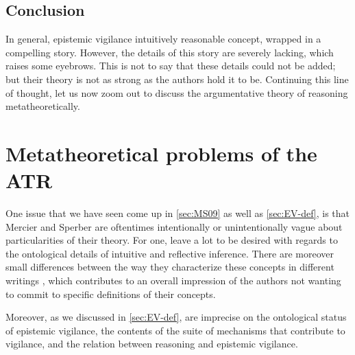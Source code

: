 \subsection{Conclusion}

In general, epistemic vigilance intuitively reasonable concept, wrapped in a compelling story. However, the details of this story are severely lacking, which raises some eyebrows. This is not to say that these details could not be added; but their theory is not as strong as the authors hold it to be. Continuing this line of thought, let us now zoom out to discuss the argumentative theory of reasoning metatheoretically.

\section{Metatheoretical problems of the ATR}
\label{sec:ont-atr}

One issue that we have seen come up in \cref{sec:MS09} as well as \cref{sec:EV-def}, is that Mercier and Sperber are oftentimes intentionally or unintentionally vague about particularities of their theory.
For one, \citet{MS09} leave a lot to be desired with regards to the ontological details of intuitive and reflective inference.
There are moreover small differences between the way they characterize these concepts in different writings \citep{MS09, MS11}, which contributes to an overall impression of the authors not wanting to commit to specific definitions of their concepts.

Moreover, as we discussed in \cref{sec:EV-def}, \citet{Sperber10} are imprecise on the ontological status of epistemic vigilance, the contents of the suite of mechanisms that contribute to vigilance, and the relation between reasoning and epistemic vigilance.

